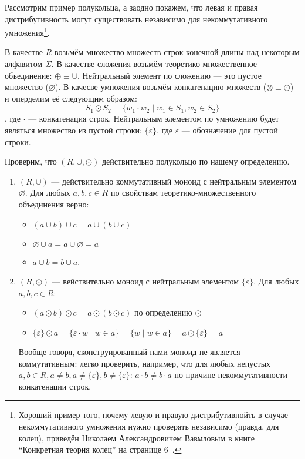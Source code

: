 \begin{example}\label{exmpl:semiring}
Рассмотрим пример полукольца, а заодно покажем, что левая и правая дистрибутивность могут существовать независимо для некоммутативного умножения\footnote{Хороший пример того, почему левую и правую дистрибутивнойть в случае некоммутативного умножения нужно проверять независимо (правда, для колец), приведён Николаем Александровичем Вавмловым в книге ``Конкретная теория колец'' на странице 6~\cite{VavilovRings}.}.

В качестве $R$ возьмём множество множеств строк конечной длины над некоторым алфавитом $\Sigma$. В качестве сложения возьмём теоретико-множественное объединение: $\oplus  \equiv \cup$. Нейтральный элемент по сложению --- это пустое множество ($\varnothing$).
В качесве умножения возьмём конкатенацию множеств ($\otimes  \equiv \odot$) и оперделим её следующим образом:
$$ S_1 \odot S_2 = \{ w_1 \cdot w_2 \mid w_1 \in S_1, w_2 \in S_2\}$$, где $\cdot$ --- конкатенация строк. Нейтральным элементом по умножению будет являться множество из пустой строки: $\{\varepsilon\}$, где $\varepsilon$ --- обозначение для пустой строки.

Проверим, что $(R, \cup, \odot)$ действительно полукольцо по нашему определению.

\begin{enumerate}

\item $(R, \cup)$ --- действительно коммутативный моноид с нейтральным элементом $\varnothing$. Для любых $a,b,c \in R$ по свойствам теоретико-множественного объединения верно:
\begin{itemize}
	\item $(a \cup b) \cup c = a \cup (b \cup c)$
	\item $\varnothing \cup a = a \cup \varnothing = a$
	\item $a \cup b = b \cup a$.
\end{itemize}

\item $(R, \odot)$ --- вействительно моноид с нейтральным элементом $\{\varepsilon\}$. Для любых $a,b,c \in R$:
\begin{itemize}
	\item $(a \odot b) \odot c = a \odot (b \odot c)$ по определению $\odot$
    \item $\{\varepsilon\} \odot a = \{\varepsilon \cdot w \mid w \in a \} = \{w \mid w \in a \} = a \odot \{\varepsilon\} = a$
\end{itemize}
Вообще говоря, сконструированный нами моноид не является коммутативным: легко проверить, например, что для любых непустых $a,b \in R, a \neq b, a \neq \{\varepsilon\}, b \neq \{\varepsilon\}$: $a \cdot b \neq b \cdot a$ по причине некоммутативности конкатенации строк.


\end{enumerate}
\end{example}

